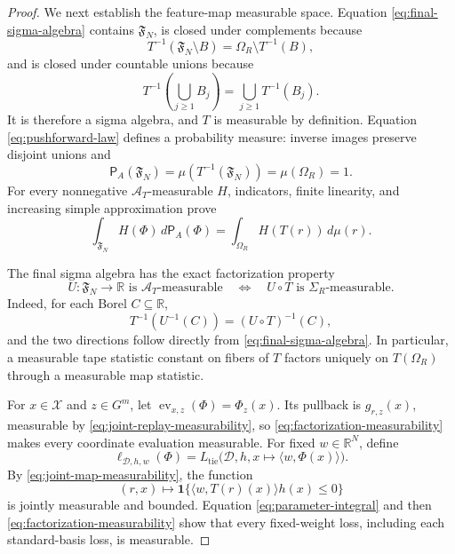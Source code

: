 \begin{proof}
We next establish the feature-map measurable space.  Equation
\eqref{eq:final-sigma-algebra} contains \(\mathfrak F_N\), is closed under
complements because
\[
T^{-1}(\mathfrak F_N\setminus B)
=\Omega_R\setminus T^{-1}(B),
\]
and is closed under countable unions because
\[
T^{-1}\!\left(\bigcup_{j\ge1}B_j\right)
=\bigcup_{j\ge1}T^{-1}(B_j).
\]
It is therefore a sigma algebra, and \(T\) is measurable by definition.
Equation \eqref{eq:pushforward-law} defines a probability measure: inverse
images preserve disjoint unions and
\[
\mathsf P_A(\mathfrak F_N)
=\mu(T^{-1}(\mathfrak F_N))=\mu(\Omega_R)=1.
\]
For every nonnegative \(\mathscr A_T\)-measurable \(H\), indicators,
finite linearity, and increasing simple approximation prove
\[
\int_{\mathfrak F_N}H(\Phi)\,d\mathsf P_A(\Phi)
=\int_{\Omega_R}H(T(r))\,d\mu(r).
\tag{A.18}\label{eq:pushforward-integral}
\]

The final sigma algebra has the exact factorization property
\[
U:\mathfrak F_N\to\mathbb R\text{ is }\mathscr A_T\text{-measurable}
\quad\Longleftrightarrow\quad
U\circ T\text{ is }\Sigma_R\text{-measurable}.
\tag{A.19}\label{eq:factorization-measurability}
\]
Indeed, for each Borel \(C\subseteq\mathbb R\),
\[
T^{-1}(U^{-1}(C))=(U\circ T)^{-1}(C),
\]
and the two directions follow directly from
\eqref{eq:final-sigma-algebra}.  In particular, a measurable tape statistic
constant on fibers of \(T\) factors uniquely on \(T(\Omega_R)\) through a
measurable map statistic.

For \(x\in\mathcal X\) and \(z\in G^m\), let
\(\operatorname{ev}_{x,z}(\Phi)=\Phi_z(x)\).  Its pullback is
\(g_{r,z}(x)\), measurable by \eqref{eq:joint-replay-measurability}, so
\eqref{eq:factorization-measurability} makes every coordinate evaluation
measurable.  For fixed \(w\in\mathbb R^N\), define
\[
\ell_{\mathcal D,h,w}(\Phi)
=L_{\mathrm{tie}}\bigl(
\mathcal D,h,x\mapsto\langle w,\Phi(x)\rangle\bigr).
\tag{A.20}\label{eq:fixed-weight-loss}
\]
By \eqref{eq:joint-map-measurability}, the function
\[
(r,x)\longmapsto
\mathbf 1\{\langle w,T(r)(x)\rangle h(x)\le0\}
\]
is jointly measurable and bounded.  Equation
\eqref{eq:parameter-integral} and then
\eqref{eq:factorization-measurability} show that every fixed-weight loss,
including each standard-basis loss, is measurable.


\end{proof}
